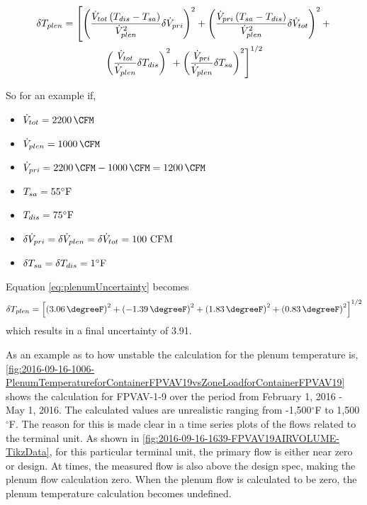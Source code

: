 \begin{multline}\label{eq:plenumUncertainty}
    \delta T_{plen} = \left[\left(  \frac{\dot{V}_{tot}\left(T_{dis}-T_{sa} \right)}{{\dot{V}_{plen}}^2}   \delta \dot{V}_{pri} \right)^2  +\left(\frac{\dot{V}_{pri}\left(T_{sa}-T_{dis} \right)}{{\dot{V}_{plen}}^2}      \delta \dot{V}_{tot}   \right)^2 + \right. \\
    \left. \left( \frac{\dot{V}_{tot}}{\dot{V}_{plen}} \delta T_{dis}   \right)^2 + \left(\frac{\dot{V}_{pri}}{\dot{V}_{plen}}  \delta T_{sa}   \right)^2  \right]^{1/2}
\end{multline}

So for an example if, 

\newcommand{\flowtotvalue}{\SI{2200}{\CFM}}
\newcommand{\plenflowvalue}{\SI{1000}{\CFM}}

\begin{itemize}
    \item \(\totflow{}=\flowtotvalue\)
    \item \(\plenflow{}=\plenflowvalue\)
    \item \(\priflow=\flowtotvalue - \plenflowvalue = \SI{1200}{\CFM} \)
    \item \(T_{sa} = 55^{\circ}\text{F} \)
    \item \(T_{dis} = 75^{\circ}\text{F} \)
    \item \(\delta\dot{V}_{pri}{}=\delta\dot{V}_{plen}=\delta\dot{V}_{tot}=100 \text{ CFM}\)
    \item \(\delta T_{sa} = \delta T_{dis} = 1^{\circ} \text{F} \)
\end{itemize}

Equation \ref{eq:plenumUncertainty} becomes
\begin{equation}\label{eq:plenumUncertainty2}
    \delta T_{plen} = \left[\left(  \SI{3.06}{\degreeF}  \right)^2  +\left( \SI{-1.39}{\degreeF}  \right)^2 +  \left( \SI{1.83}{\degreeF} \right)^2 + \left(\SI{0.83}{\degreeF}  \right)^2  \right]^{1/2}
\end{equation}
which results in a final uncertainty of \SI{3.91}{\degreeF}.

As an example as to how unstable the calculation for the plenum
temperature is, \figref{}
\ref{fig:2016-09-16-1006-PlenumTemperatureforContainerFPVAV19vsZoneLoadforContainerFPVAV19}
shows the calculation for FPVAV-1-9 over the period from February 1,
2016 - May 1, 2016. The calculated values are unrealistic ranging from
-1,500\(^\circ\)F to 1,500\(^\circ\)F. The reason for this is made clear
in a time series plots of the flows related to the terminal unit. As
shown in \figref{} \ref{fig:2016-09-16-1639-FPVAV19AIRVOLUME-TikzData},
for this particular terminal unit, the primary flow is either near zero
or design. At times, the measured flow is also above the design
spec, making the plenum flow calculation zero. When the plenum flow is
calculated to be zero, the plenum temperature calculation becomes
undefined.

